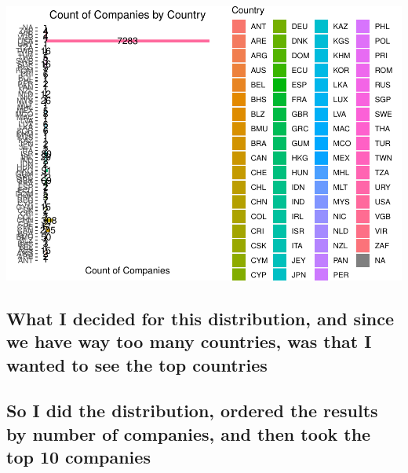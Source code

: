 \documentclass[]{article}
\begin{document}
\includegraphics{Main_files/figure-latex/unnamed-chunk-14-1.pdf}

\hypertarget{what-i-decided-for-this-distribution-and-since-we-have-way-too-many-countries-was-that-i-wanted-to-see-the-top-countries}{%
\subsection{What I decided for this distribution, and since we have way
too many countries, was that I wanted to see the top
countries}\label{what-i-decided-for-this-distribution-and-since-we-have-way-too-many-countries-was-that-i-wanted-to-see-the-top-countries}}

\hypertarget{so-i-did-the-distribution-ordered-the-results-by-number-of-companies-and-then-took-the-top-10-companies}{%
\subsection{So I did the distribution, ordered the results by number of
companies, and then took the top 10
companies}\label{so-i-did-the-distribution-ordered-the-results-by-number-of-companies-and-then-took-the-top-10-companies}}
\end{document}
